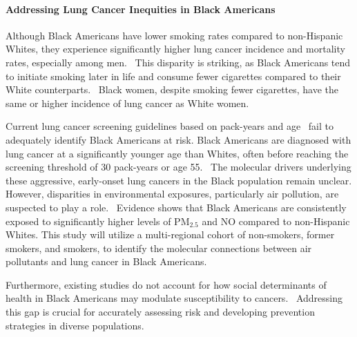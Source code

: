 \paragraph{Addressing Lung Cancer Inequities in Black Americans}
Although Black Americans have lower smoking rates compared to non-Hispanic Whites, 
they experience significantly higher lung cancer incidence and mortality rates, especially among men.~\cite{belony_abstract_2022,thaiparambil_abstract_2023,valencia_interrogating_2022} 
This disparity is striking, as Black Americans tend to initiate smoking later in life and consume fewer cigarettes compared to their White counterparts.~\cite{thaiparambil_abstract_2023,hede_drilling_2010} 
Black women, despite smoking fewer cigarettes, have the same or higher incidence of lung cancer as White women. %

Current lung cancer screening guidelines based on pack-years and age~\cite{landy_absolute_2024} fail to adequately identify Black Americans at risk.
Black Americans are diagnosed with lung cancer at a significantly younger age than Whites, often before reaching the screening threshold of 30 pack-years or age 55.~\cite{meza_evaluation_2021} 
The molecular drivers underlying these aggressive, early-onset lung cancers in the Black population remain unclear.
However, disparities in environmental exposures, particularly air pollution, are suspected to play a role.~\cite{marcinkiewicz_impact_2023}
Evidence shows that Black Americans are consistently exposed to significantly higher levels of PM$_{2.5}$ and NO compared to non-Hispanic Whites. %
This study will utilize a multi-regional cohort of non-smokers, former smokers, and smokers,
to identify the molecular connections between air pollutants and lung cancer in Black Americans.

Furthermore, existing studies do not account for how social determinants of health in Black Americans may modulate susceptibility to cancers.~\cite{valencia_interrogating_2022} 
Addressing this gap is crucial for accurately assessing risk and developing prevention strategies in diverse populations.

